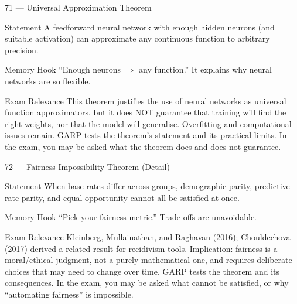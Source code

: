 \documentclass[aspectratio=169,8pt]{beamer}
\begin{document}
	\begin{frame}{71 --- Universal Approximation Theorem}
		\begin{block}{Statement}
			A feedforward neural network with enough hidden neurons (and suitable activation) can approximate any continuous function to arbitrary precision.
		\end{block}
		\begin{block}{Memory Hook}
			``Enough neurons $\Rightarrow$ any function.'' It explains why neural networks are so flexible.
		\end{block}
		\begin{block}{Exam Relevance}
			This theorem justifies the use of neural networks as universal function approximators, but it does NOT guarantee that training will find the right weights, nor that the model will generalise. Overfitting and computational issues remain. GARP tests the theorem's statement and its practical limits. In the exam, you may be asked what the theorem does and does not guarantee.
		\end{block}
	\end{frame}
	
	\begin{frame}{72 --- Fairness Impossibility Theorem (Detail)}
		\begin{block}{Statement}
			When base rates differ across groups, demographic parity, predictive rate parity, and equal opportunity cannot all be satisfied at once.
		\end{block}
		\begin{block}{Memory Hook}
			``Pick your fairness metric.'' Trade-offs are unavoidable.
		\end{block}
		\begin{block}{Exam Relevance}
			Kleinberg, Mullainathan, and Raghavan (2016); Chouldechova (2017) derived a related result for recidivism tools. Implication: fairness is a moral/ethical judgment, not a purely mathematical one, and requires deliberate choices that may need to change over time. GARP tests the theorem and its consequences. In the exam, you may be asked what cannot be satisfied, or why ``automating fairness'' is impossible.
		\end{block}
	\end{frame}
	
\end{document}
